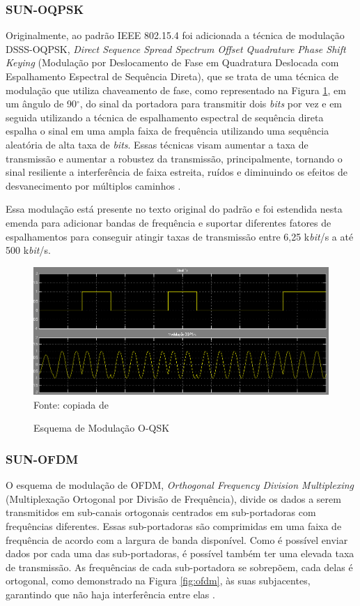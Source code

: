 \subsubsection{SUN-OQPSK}
\label{oqpsk}
Originalmente, ao padrão IEEE 802.15.4 foi adicionada a técnica de modulação DSSS-OQPSK, \emph{Direct Sequence Spread Spectrum Offset Quadrature Phase Shift Keying} (Modulação por Deslocamento de Fase em Quadratura Deslocada com Espalhamento Espectral de Sequência Direta), que se trata de uma técnica de modulação que utiliza chaveamento de fase, como representado na Figura \ref{fig:oqpsk}, em um ângulo de 90$^{\circ}$, do sinal da portadora para transmitir dois \emph{bits} por vez e em seguida utilizando a técnica de espalhamento espectral de sequência direta espalha o sinal em uma ampla faixa de frequência utilizando uma sequência aleatória de alta taxa de \emph{bits}. Essas técnicas visam aumentar a taxa de transmissão e aumentar a robustez da transmissão, principalmente, tornando o sinal resiliente a interferência de faixa estreita, ruídos e diminuindo os efeitos de desvanecimento por múltiplos caminhos \cite{goldsmith2005wireless}.

Essa modulação está presente no texto original do padrão e foi estendida nesta emenda para adicionar bandas de frequência e suportar diferentes fatores de espalhamentos para conseguir atingir taxas de transmissão entre 6,25 k\emph{bit}/s a até 500 k\emph{bit}/s.

\begin{figure}[ht]
      \begin{center}
            \caption{Esquema de Modulação O-QSK}
            \includegraphics[width=.7\textwidth]{./sections/textual/chapters/images/oqpsk.png}\\
            Fonte: copiada de \cite{figOQPSK}
            \label{fig:oqpsk}
      \end{center}
\end{figure}


\subsubsection{SUN-OFDM}
O esquema de modulação de OFDM, \emph{Orthogonal Frequency Division Multiplexing} (Multiplexação Ortogonal por Divisão de Frequência), divide os dados a serem transmitidos em sub-canais ortogonais centrados em  sub-portadoras com frequências diferentes. Essas sub-portadoras são comprimidas em uma faixa de frequência de acordo com a largura de banda disponível. Como é possível enviar dados por cada uma das sub-portadoras, é possível também ter uma elevada taxa de transmissão. As frequências de cada sub-portadora se sobrepõem, cada delas é ortogonal, como demonstrado na Figura \ref{fig:ofdm}, às suas subjacentes, garantindo que não haja interferência entre elas \cite{rappaport2009}\cite{goldsmith2005wireless}.

